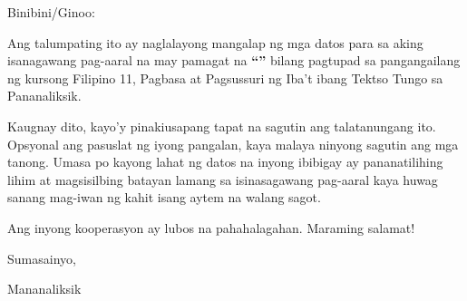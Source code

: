 \documentclass[
  parskip=half,
  backaddress=false,
  address=false,
  foldmarks=true,
  foldmarks=blmtP,
  version=last,
  paper=legal,
  enlargefirstpage=true,
  fromalign=left,
  addrfield=topaligned
  ]{scrlttr2}
\begin{document}
  Binibini/Ginoo:
  
  Ang talumpating ito ay naglalayong mangalap ng mga datos para sa aking
  isanagawang pag-aaral na may pamagat na {\bfseries``\researchtitle''} bilang pagtupad sa
  pangangailang ng kursong Filipino 11, Pagbasa at Pagsussuri ng Iba't ibang
  Tektso Tungo sa Pananaliksik.

  Kaugnay dito, kayo'y pinakiusapang tapat na sagutin ang talatanungang ito.
  Opsyonal ang pasuslat ng iyong pangalan, kaya malaya ninyong sagutin ang mga
  tanong. Umasa po kayong lahat ng datos na inyong ibibigay ay pananatilihing
  lihim at magsisilbing batayan lamang sa isinasagawang pag-aaral kaya huwag
  sanang mag-iwan ng kahit isang aytem na walang sagot.

  Ang inyong kooperasyon ay lubos na pahahalagahan. Maraming salamat!

  Sumasainyo,

  Mananaliksik

\end{document}
